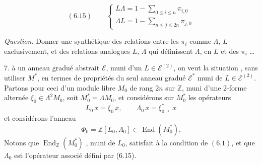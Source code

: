 
\[ (6.15) \qquad \begin{cases} L \Lambda = 1 - \sum_{0 \leqslant i \leqslant n} \pi_{i,0} \\[2pt] \Lambda L = 1 - \sum_{n \leqslant j \leqslant 2n} \pi_{j,0} \end{cases} \]



\emph{Question.} Donner une \ill{} synthétique des relations entre les
$\pi_{i}$ comme \struck{\ill{}} $\Lambda$, $L$ exclusivement, et \ill{} des
relations analogues \ill{} $L$, $\Lambda$ \ill{} qui définissent $\Lambda$,
 en $L$ et des $\pi_{i}$ \ldots

7.  à un anneau gradué abstrait $\mathcal{E}$, muni d'un
$L \in \mathcal{E}^{(2)}$, on veut  la situation
, sans utiliser $M^{*}$, en termes de propriétés du
seul anneau gradué $\mathcal{E}^{*}$ muni de $L \in \mathcal{E}^{(2)}$.
Partons pour ceci \struck{\ill{}} d'un module libre $M_{0}$ de rang $2n$ sur
$\mathbb{Z}$, muni d'une $2$-forme alternée 
 $\xi_{0} \in \Lambda^{2} M_{0}$,  soit $M^{*}_{0} = \Lambda M_{0}$,
et considérons sur $M^{*}_{0}$ les opérateurs
\[ L_{0}\, x = \xi_{0}\, x , \qquad \Lambda_{0}\, x = \xi^{*}_{0} \lrcorner\, x \]
et considérons l'anneau 
\[ \Phi_{0} = \mathbb{Z}[L_{0}, \Lambda_{0}] \subset \operatorname{End}(M^{*}_{0}) . \]
Notons que $\operatorname{End}_{\mathbb{Z}}(M^{*}_{0})$ , muni de $L_{0}$, satisfait à la condition
de $(6.1)$\uncertain{$(\omega)$}, \struck{\ill{}} et que $\Lambda_{0}$ est
l'opérateur associé défini par (6.15).


